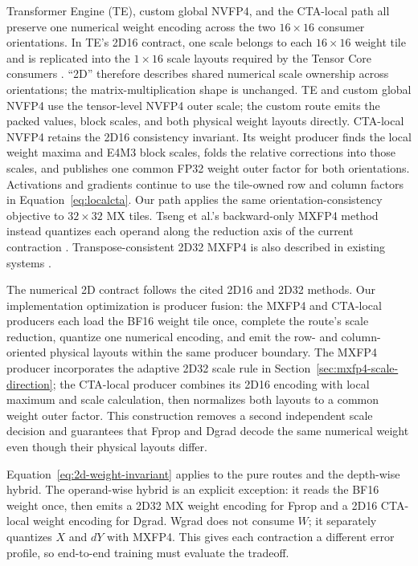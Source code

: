 Transformer Engine (TE), custom global NVFP4, and the CTA-local path all preserve one
numerical weight encoding across the two $16\times16$ consumer orientations.
In TE's 2D16 contract, one scale belongs to each $16\times16$ weight tile and
is replicated into the $1\times16$ scale layouts required by the Tensor
Core consumers \cite{nvidia2025nvfp4,nvidia2026te}. ``2D'' therefore describes
shared numerical scale ownership across orientations; the matrix-multiplication
shape is unchanged. TE and
custom global NVFP4 use the tensor-level NVFP4 outer scale; the custom route emits the
packed values, block scales, and both physical weight layouts directly.
CTA-local NVFP4 retains the 2D16 consistency invariant. Its weight producer
finds the local weight maxima and E4M3 block scales, folds the relative
corrections into those scales, and publishes one common FP32 weight outer
factor for both orientations. Activations and gradients continue to use the
tile-owned row and column factors in Equation~\ref{eq:localcta}. Our \mxfp{} path applies the same
orientation-consistency objective to $32\times32$ MX tiles. Tseng et al.'s
backward-only MXFP4 method instead
quantizes each operand along the reduction axis of the current contraction
\cite{tseng2025mxfp4}. Transpose-consistent 2D32 MXFP4 is also described in
existing systems \cite{rahimifar2026transposition,cim2026nativemxfp4}.

The numerical 2D contract follows the cited 2D16 and 2D32 methods. Our
implementation optimization is producer fusion: the MXFP4 and CTA-local
producers each load the BF16 weight tile once,
complete the route's scale reduction, quantize one numerical encoding, and
emit the row- and column-oriented physical layouts within the same producer
boundary. The MXFP4 producer incorporates
the adaptive 2D32 scale rule in Section~\ref{sec:mxfp4-scale-direction}; the
CTA-local producer combines its 2D16 encoding with local maximum and scale
calculation, then normalizes both layouts to a common weight outer factor. This construction
removes a second independent scale decision and guarantees that Fprop and
Dgrad decode the same numerical weight even though their physical layouts
differ.

Equation~\ref{eq:2d-weight-invariant} applies to the pure routes and the
depth-wise hybrid. The operand-wise hybrid is an explicit exception: it reads
the BF16 weight once, then emits a 2D32 MX weight encoding for Fprop and a 2D16
CTA-local weight encoding for Dgrad. Wgrad does not consume $W$; it separately
quantizes $X$ and $dY$ with MXFP4. This gives each contraction a different
error profile, so end-to-end training must evaluate the tradeoff.

